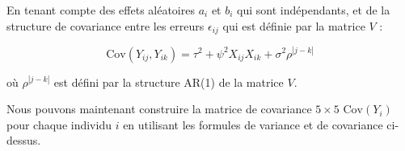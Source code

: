 \documentclass[../main.tex]{subfiles}
\begin{document}
\begin{CJK*}{UTF8}{gbsn}
En tenant compte des effets aléatoires \( a_i \) et \( b_i \) qui sont indépendants, et de la structure de covariance entre les erreurs \( \epsilon_{ij} \) qui est définie par la matrice \( V \) :

\begin{equation*}
\text{Cov}(Y_{ij}, Y_{ik}) = \tau^2 + \psi^2 X_{ij} X_{ik} + \sigma^2 \rho^{|j-k|}
\end{equation*}

où \( \rho^{|j-k|} \) est défini par la structure AR(1) de la matrice \( V \).

Nous pouvons maintenant construire la matrice de covariance $5 \times 5$ 
\( \text{Cov}(Y_i) \) pour chaque individu \( i \) en utilisant les formules de variance et de covariance ci-dessus.

\end{CJK*}
\end{document}
